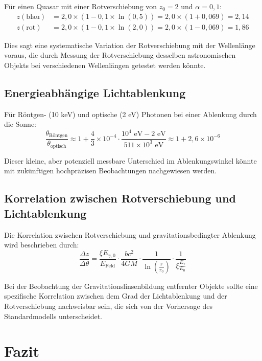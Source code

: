 \documentclass[12pt,a4paper]{article}
\newcommand{\efield}{E_{\text{Feld}}}
\theoremstyle{definition}
\begin{document}
	Für einen Quasar mit einer Rotverschiebung von $z_0 = 2$ und $\alpha = 0,1$:
	\begin{align}
		z(\text{blau}) &= 2,0 \times (1 - 0,1 \times \ln(0,5)) = 2,0 \times (1 + 0,069) = 2,14 \\
		z(\text{rot}) &= 2,0 \times (1 - 0,1 \times \ln(2,0)) = 2,0 \times (1 - 0,069) = 1,86
	\end{align}
	
	Dies sagt eine systematische Variation der Rotverschiebung mit der Wellenlänge voraus, die durch Messung der Rotverschiebung desselben astronomischen Objekts bei verschiedenen Wellenlängen getestet werden könnte.
	
	\subsection{Energieabhängige Lichtablenkung}
	
	Für Röntgen- (10 keV) und optische (2 eV) Photonen bei einer Ablenkung durch die Sonne:
	\begin{equation}
		\frac{\theta_{\text{Röntgen}}}{\theta_{\text{optisch}}} \approx 1 + \frac{4}{3} \times 10^{-4} \cdot \frac{10^4 \text{ eV} - 2 \text{ eV}}{511 \times 10^3 \text{ eV}} \approx 1 + 2,6 \times 10^{-6}
	\end{equation}
	
	Dieser kleine, aber potenziell messbare Unterschied im Ablenkungswinkel könnte mit zukünftigen hochpräzisen Beobachtungen nachgewiesen werden.
	
	\subsection{Korrelation zwischen Rotverschiebung und Lichtablenkung}
	
	Die Korrelation zwischen Rotverschiebung und gravitationsbedingter Ablenkung wird beschrieben durch:
	\begin{equation}
		\frac{\Delta z}{\Delta \theta} = \frac{\xi E_{\gamma,0}}{\efield} \cdot \frac{bc^2}{4GM} \cdot \frac{1}{\ln\left(\frac{r}{r_0}\right)} \cdot \frac{1}{\xi \frac{E_\gamma}{E_0}}
	\end{equation}
	
	Bei der Beobachtung der Gravitationslinsenbildung entfernter Objekte sollte eine spezifische Korrelation zwischen dem Grad der Lichtablenkung und der Rotverschiebung nachweisbar sein, die sich von der Vorhersage des Standardmodells unterscheidet.
	
	\section{Fazit}
	
\end{document}
